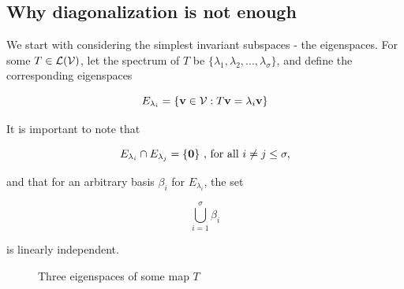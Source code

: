 





\subsection{Why diagonalization is not enough}
We start with considering the simplest invariant subspaces - the eigenspaces.
For some \(T\in\mathcal{L}(\mathcal{V})\), let the spectrum of \(T\) be \(\{\lambda_1, \lambda_2,...,\lambda_\sigma\}\), and define the corresponding eigenspaces

\begin{equation*}
    E_{\lambda_{i}}=\{\mathbf{v}\in\mathcal{V}: T\mathbf{v}=\lambda_i \mathbf{v}\}
\end{equation*}

It is important to note that

\begin{equation*}
    E_{\lambda_i}\cap E_{\lambda_j}=\{\mathbf{0}\}  \ \text{, for all }i\neq j\leq \sigma,
\end{equation*}

and that for an arbitrary basis \(\beta_i\) for \(E_{\lambda_i}\), the set

\begin{equation*}
    \bigcup_{i=1}^{\sigma} \beta_i
\end{equation*}

is linearly independent.

\begin{figure}[H]
    \centering
    \caption{Three eigenspaces of some map \(T\)}
\end{figure}


